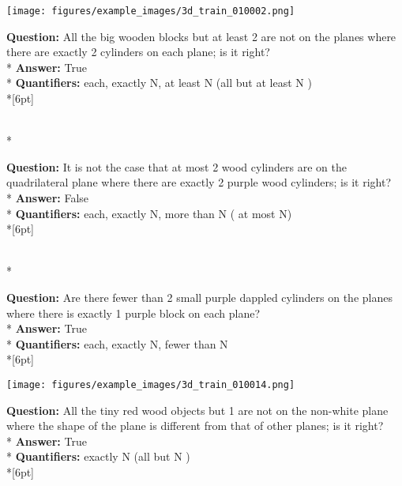 \begin{figure*}
  \begin{minipage}{0.48\textwidth}
    \texttt{[image: figures/example\_images/3d\_train\_010002.png]}
    \begin{minipage}[t][2.2cm][t]{1\textwidth}
      \footnotesize
      \textbf{Question:} All the big wooden blocks but at least 2 are not on the planes where there are exactly 2 cylinders on each plane; is it right? \\*
      \textbf{Answer:}  True \\*
      \textbf{Quantifiers:} each, exactly N, at least N (all but at least N ) \\*[6pt]
    \end{minipage}\\*
    \begin{minipage}[t][2.2cm][t]{1\textwidth}
      \footnotesize
      \textbf{Question:} It is not the case that at most 2 wood cylinders are on the quadrilateral plane where there are exactly 2 purple wood cylinders; is it right? \\*
      \textbf{Answer:} False \\*
      \textbf{Quantifiers:} each, exactly N, more than N ( at most N)  \\*[6pt]
    \end{minipage}\\*
    \begin{minipage}[t][2.2cm][t]{1\textwidth}
      \footnotesize
      \textbf{Question:} Are there fewer than 2 small purple dappled cylinders on the planes where there is exactly 1 purple block on each plane? \\*
      \textbf{Answer:} True \\*
      \textbf{Quantifiers:} each, exactly N, fewer than N \\*[6pt]
    \end{minipage}
  \end{minipage}
  \hspace{3.5mm}
  \begin{minipage}{0.48\textwidth}
    \texttt{[image: figures/example\_images/3d\_train\_010014.png]}
    \begin{minipage}[t][2.2cm][t]{1\textwidth}
      \footnotesize
      \textbf{Question:} All the tiny red wood objects but 1 are not on the non-white plane where the shape of the plane is different from that of other planes; is it right? \\*
      \textbf{Answer:} True \\*
      \textbf{Quantifiers:} exactly N (all but N ) \\*[6pt]

\end{minipage}
\end{minipage}
\end{figure*}
